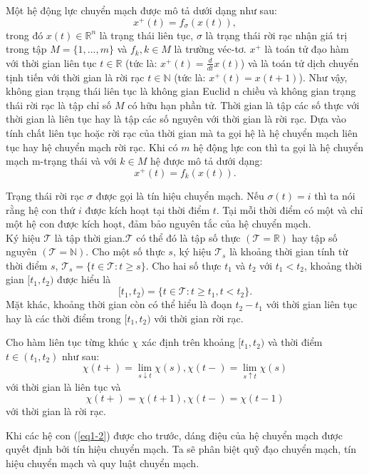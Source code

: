 \documentclass[14pt,a4paper,oneside]{report}		%
\theoremstyle{definition}
\begin{document}
Một hệ động lực chuyển mạch được mô tả dưới dạng như sau:
\begin{equation} \label{eq1-1}
x^+(t) = f_\sigma(x(t)),
\end{equation}
trong đó $x(t)\in\mathbb{R}^n$ là trạng thái liên tục, $\sigma$ là trạng thái rời rạc nhận giá trị trong tập $M = \{1,...,m\}$ và $f_k, k\in M$ là trường véc-tơ. $x^+$ là toán tử đạo hàm với thời gian liên tục $t\in\mathbb{R}$ (tức là: $x^+(t)=\frac{d}{dt}x(t)$) và là toán tử dịch chuyển tịnh tiến với thời gian là rời rạc $t\in\mathbb{N}$ (tức là: $x^+(t)=x(t+1)$). Như vậy, không gian trạng thái liên tục là không gian Euclid n chiều và không gian trạng thái rời rạc là tập chỉ số $M$ có hữu hạn phần tử. Thời gian là tập các số thực với thời gian là liên tục hay là tập các số nguyên với thời gian là rời rạc. Dựa vào tính chất liên tục hoặc rời rạc của thời gian mà ta gọi hệ là hệ chuyển mạch liên tục hay hệ chuyển mạch rời rạc. Khi có $m$ hệ động lực con thì ta gọi là hệ chuyển mạch m-trạng thái và với $k\in M$ hệ được mô tả dưới dạng:
\begin{equation} \label{eq1-2}
x^+(t) = f_k(x(t)).
\end{equation}

Trạng thái rời rạc $\sigma$ được gọi là tín hiệu chuyển mạch. Nếu $\sigma(t)=i$ thì ta nói rằng hệ con thứ $i$ được kích hoạt tại thời điểm $t$. Tại mỗi thời điểm có một và chỉ một hệ con được kích hoạt, đảm bảo nguyên tắc của hệ chuyển mạch.\\

Ký hiệu $\mathcal{T}$ là tập thời gian.$\mathcal{T}$ có thể đó là tập số thực $(\mathcal{T} = \mathbb{R})$ hay tập số nguyên $(\mathcal{T} = \mathbb{N})$. Cho một số thực $s$, ký hiệu $\mathcal{T}_s$ là khoảng thời gian tính từ thời điểm $s$, $\mathcal{T}_s=\{t\in\mathcal{T} : t\geq s\}$. Cho hai số thực $t_1$ và $t_2$ với $t_1 < t_2$, khoảng thời gian $[t_1, t_2)$ được hiểu là
$$[t_1, t_2)=\{t\in\mathcal{T}: t\geq t_1, t<t_2\}.$$
Mặt khác, khoảng thời gian còn có thể hiểu là đoạn $t_2 - t_1$ với thời gian liên tục hay là các thời điểm trong $[t_1,t_2)$ với thời gian rời rạc. 

Cho hàm liên tục từng khúc $\chi$ xác định trên khoảng $[t_1,t_2)$ và thời điểm $t \in (t_1,t_2)$ như sau:
$$\chi(t+)=\lim_{s\downarrow t}\chi(s), \chi(t-)=\lim_{s\uparrow t}\chi(s)$$
với thời gian là liên tục và
$$\chi(t+)=\chi(t+1), \chi(t-)=\chi(t-1)$$
với thời gian là rời rạc.

Khi các hệ con (\ref{eq1-2}) được cho trước, dáng điệu của hệ chuyển mạch được quyết định bởi tín hiệu chuyển mạch. Ta sẽ phân biệt quỹ đạo chuyển mạch, tín hiệu chuyển mạch và quy luật chuyển mạch.
\end{document}
